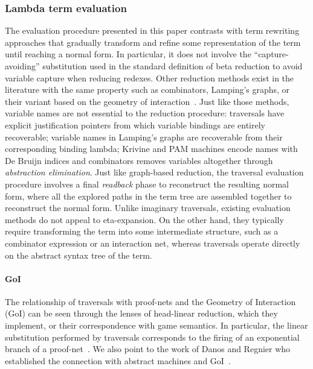\documentclass{elsarticle}
\theoremstyle{plain}
\theoremstyle{definition}
\begin{document}
\subsubsection{Lambda term evaluation}
The evaluation procedure presented in this paper contrasts with term rewriting approaches that gradually transform and refine some representation of the term until reaching a normal form. In particular, it does not involve the ``capture-avoiding'' substitution used in the standard definition of beta reduction to avoid variable capture when reducing redexes. Other reduction methods exist in the literature with the same property such as combinators, Lamping's graphs, or their variant based on the geometry of interaction~\cite{Lamping:1989:AOL:96709.96711, Gonthier:1992:GOL:143165.143172, curry_combinatorylogic, Barendregt84, the-implementation-of-functional-programming-languages}.
Just like those methods, variable names are not essential to the reduction procedure: traversals have explicit justification pointers from which variable bindings are entirely recoverable; variable names in Lamping's graphs are recoverable from their corresponding binding lambda;
Krivine and PAM machines encode names with De Bruijn indices
and combinators removes variables altogether through \emph{abstraction elimination}.
Just like graph-based reduction, the traversal evaluation procedure involves a final \emph{readback} phase to reconstruct the resulting normal form, where
all the explored paths in the term tree are assembled together to reconstruct
the normal form.
Unlike imaginary traversals, existing evaluation methods do not appeal to eta-expansion. On the other hand, they typically require transforming the term into some intermediate structure, such as a combinator expression or an interaction net, whereas traversals operate directly on the abstract syntax tree of the term.

\paragraph{GoI} The relationship of traversals with proof-nets and the Geometry of Interaction (GoI) can be seen through the lenses of head-linear reduction, which they implement, or their correspondence with game semantics. In particular, the linear substitution performed by traversals corresponds to
the firing of an exponential branch of a proof-net~\cite{MASCARI1994111}. We also point to the work of Danos and Regnier who established the connection with abstract machines and GoI~\cite{danosherbelinregnier1996}.
\end{document}
